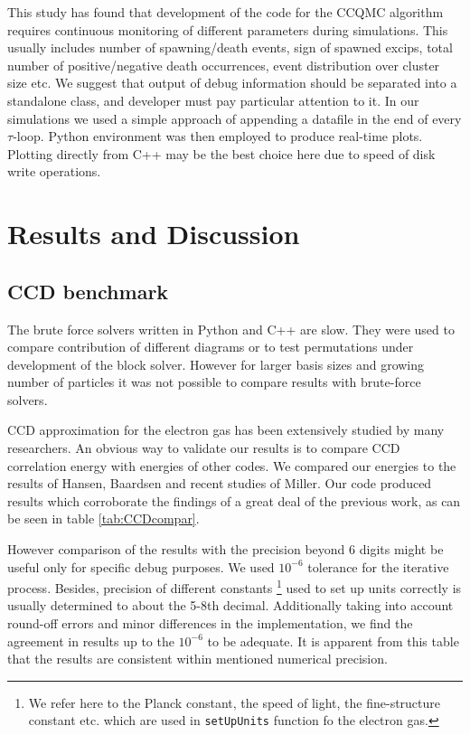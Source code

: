 \documentclass[twoside,english]{uiofysmaster}
\newcommand{\classname}[1]{\texttt{#1}}
\begin{document}
This study has found that development of the code for the CCQMC algorithm requires continuous monitoring of different parameters during simulations. This usually includes number of spawning/death events, sign of spawned excips, total number of positive/negative death occurrences, event distribution over cluster size etc.
We suggest that output of debug information should be separated into a standalone class, and developer must pay particular attention to it. In our simulations we used a simple approach of appending a datafile in the end of every $\tau$-loop. Python environment was then employed to produce real-time plots. Plotting directly from C++ may be the best choice here due to speed of disk write operations.  

\chapter{Results and Discussion}






\section{CCD benchmark}

The brute force solvers written in Python and C++ are slow. They were used to compare contribution of different diagrams or to test permutations under development of the block solver. However for larger basis sizes and growing number of particles it was not possible to compare results with brute-force solvers.

CCD approximation for the electron gas has been extensively studied by many researchers. An obvious way to validate our results is to compare CCD correlation energy with energies of other codes. We compared our energies to the results of Hansen\cite{HansenCoupledclusterstudies},  Baardsen \cite{BaardsenCoupledclustertheoryinfinite2014} and recent studies of Miller\cite{MillerQuantumMechanicalStudies2017}. Our code produced results which corroborate the findings of a great deal of the previous work, as can be seen in table \ref{tab:CCDcompar}.

However comparison of the results with the precision beyond 6 digits might be useful only for specific debug purposes. We used $10^{-6}$ tolerance for the iterative process. Besides, precision of different constants \footnote{We refer here to the Planck constant, the speed of light, the fine-structure constant etc. which are used in \classname{setUpUnits} function fo the electron gas.} used to set up units correctly is usually determined to about the 5-8th decimal. Additionally taking into account round-off errors and minor differences in the implementation, we find the agreement in results up to the $10^{-6}$ to be adequate.
It is apparent from this table that the results are consistent within mentioned numerical precision.
\end{document}
